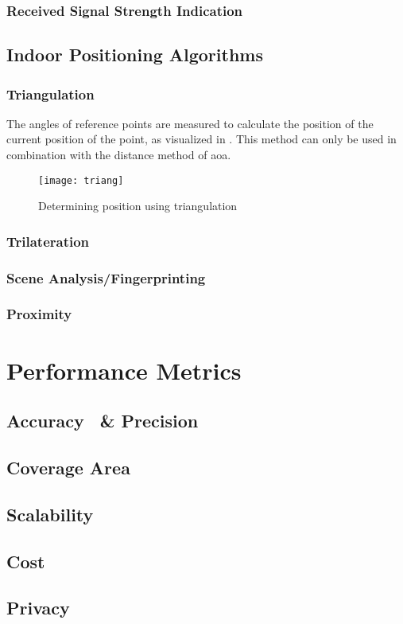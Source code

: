 \subsubsection{Received Signal Strength Indication}
\subsection{Indoor Positioning Algorithms}
\subsubsection{Triangulation}
The angles of reference points are measured to calculate the position of the current position of the point, as visualized in \cite{fig:triang}. This method can only be used in combination with the distance method of \acrlong{aoa}.
\begin{figure}[h!]
\centering
\texttt{[image: triang]}
\caption{Determining position using triangulation ~\cite{Loy2018}}
\label{fig:triang}
\end{figure}
\subsubsection{Trilateration}
\subsubsection{Scene Analysis/Fingerprinting}
\subsubsection{Proximity}
\section{Performance Metrics}
\subsection{Accuracy ~\& Precision}
\subsection{Coverage Area}
\subsection{Scalability}
\subsection{Cost}
\subsection{Privacy}
